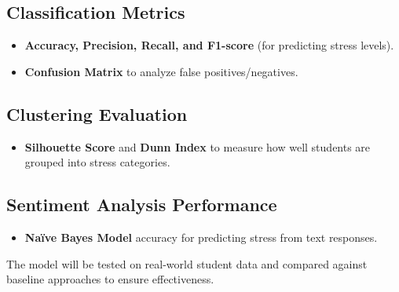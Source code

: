 \documentclass[a4paper,11pt]{article}
\begin{document}
\subsection{Classification Metrics}
\begin{itemize}
    \item \textbf{Accuracy, Precision, Recall, and F1-score} (for predicting stress levels).
    \item \textbf{Confusion Matrix} to analyze false positives/negatives.
\end{itemize}

\subsection{Clustering Evaluation}
\begin{itemize}
    \item \textbf{Silhouette Score} and \textbf{Dunn Index} to measure how well students are grouped into stress categories.
\end{itemize}

\subsection{Sentiment Analysis Performance}
\begin{itemize}
    \item \textbf{Naïve Bayes Model} accuracy for predicting stress from text responses.
\end{itemize}

The model will be tested on real-world student data and compared against baseline approaches to ensure effectiveness.
\end{document}
